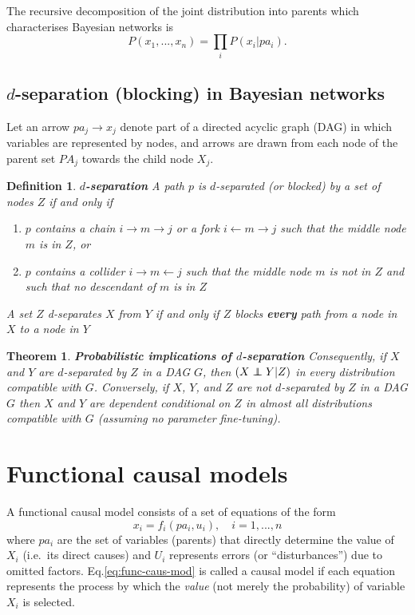 \documentclass[11pt]{article}
\numberwithin{equation}{section}
\newcommand\indep{\protect\mathpalette{\protect\independenT}{\perp}}
\def\independenT#1#2{\mathrel{\rlap{$#1#2$}\mkern2mu{#1#2}}}
\newtheorem{thm}{Theorem}[section]
\newtheorem{defn}{Definition}[section]
\begin{document}
The recursive decomposition of the joint distribution into parents which characterises Bayesian networks is
\begin{equation}
P(x_1, ..., x_n) = \prod_i P(x_i|pa_i). \label{eq:bayes-net-char}
\end{equation}

\subsection{$d$-separation (blocking) in Bayesian networks} \label{sec:blocking}

Let an arrow $pa_j \rightarrow x_j$ denote part of a directed acyclic graph (DAG) in which variables are represented by nodes, and arrows are drawn from each node of the parent set $PA_j$ towards the child node $X_j$.

\begin{defn}
\textbf{$d$-separation} A path $p$ is $d$-separated (or blocked) by a set of nodes $Z$ if and only if
\begin{enumerate}[noitemsep]
\item $p$ contains a chain $i \rightarrow m \rightarrow j$ or a fork $i \leftarrow m \rightarrow j$ such that the middle node $m$ is in $Z$, or
\item $p$ contains a collider $i \rightarrow m \leftarrow j$ such that the middle node $m$ is not in $Z$ and such that no descendant of $m$ is in $Z$
\end{enumerate}
A set $Z$ d-separates $X$ from $Y$ if and only if $Z$ blocks \textbf{every} path from a node in $X$ to a node in $Y$
\end{defn}

\begin{thm}
\textbf{Probabilistic implications of $d$-separation} Consequently, if $X$ and $Y$ are $d$-separated by $Z$ in a DAG $G$, then $(X \indep Y | Z)$ in every distribution compatible with $G$. Conversely, if $X$, $Y$, and $Z$ are \textit{not} $d$-separated by $Z$ in a DAG $G$ then $X$ and $Y$ are dependent conditional on $Z$ in almost all distributions compatible with $G$ (assuming no parameter fine-tuning).
\end{thm}

\section{Functional causal models}
A functional causal model consists of a set of equations of the form
\begin{equation}
x_i = f_i(pa_i, u_i), \quad i=1,...,n \label{eq:func-caus-mod}
\end{equation}
where $pa_i$ are the set of variables (parents) that directly determine the value of $X_i$ (i.e.\ its direct causes) and $U_i$ represents errors (or ``disturbances'') due to omitted factors. Eq.\eqref{eq:func-caus-mod} is called a causal model if each equation represents the process by which the \textit{value} (not merely the probability) of variable $X_i$ is selected.
\end{document}
